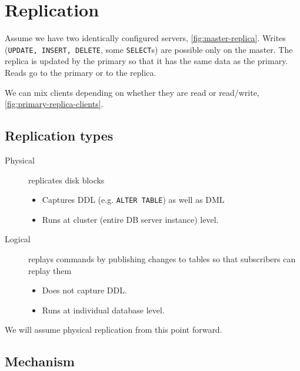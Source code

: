 \section{Replication}

Assume we have two identically configured servers, \autoref{fig:master-replica}.
Writes (\texttt{UPDATE, INSERT, DELETE}, some \texttt{SELECT}s) are possible only on the master.
The replica is updated by the primary so that it has the same data as the primary.
Reads go to the primary or to the replica.


We can mix clients depending on whether they are read or read/write, \autoref{fig:primary-replica-clients}.


\subsection{Replication types}

\begin{description}
\item[Physical] replicates disk blocks
  \begin{itemize}
  \item Captures DDL (e.g. \texttt{ALTER TABLE}) as well as DML
  \item Runs at cluster (entire DB server instance) level.
  \end{itemize}
\item[Logical] replays commands by publishing changes to tables so that subscribers can replay them
  \begin{itemize}
  \item Does not capture DDL.
  \item Runs at individual database level. 
  \end{itemize}
\end{description}
We will assume physical replication from this point forward.

\subsection{Mechanism}

